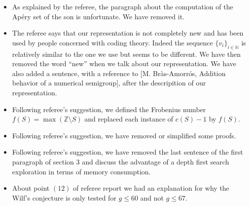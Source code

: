 \documentclass{amsart}
\begin{document}
\begin{itemize}

\item As explained by the referee, the paragraph about the computation of the Ap\'ery set of the son is unfortunate. We have removed it.


\item The referee says that our representation is not completely new and has been used by people concerned with coding theory.
  Indeed the sequence $\{v_i\}_{i\in \mathbb{N}}$ is relatively similar to the one we use but seems to be different. 
  We have then removed the word ``new'' when we talk about our representation. 
  We have also added a sentence, with a reference to [M. Br\`as-Amorr\'os, Addition behavior of a numerical semigroup], after the descripition of our representation.
  
\item Following referee's suggestion, we defined the Frobenius number $f(S)=\max(\mathbb{Z}\setminus S)$ and replaced each instance of $c(S)-1$ by $f(S)$.

\item Following referee's suggestion, we have removed or simplified some proofs.

\item Following referee's suggestion, we have removed the last sentence of the first paragraph of section 3 and discuss the advantage of a depth first search exploration in terms of memory consumption.
  
\item About point $(12)$ of referee report we had an explanation for why the Wilf's conjecture is only tested for $g\leq 60$ and not $g\leq 67$.
  
\end{itemize}
\end{document}
